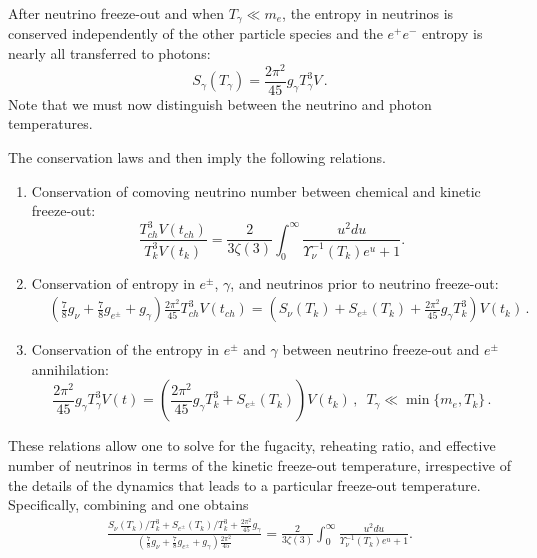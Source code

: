 After neutrino freeze-out and when $T_{\gamma}\ll m_e$, the entropy in neutrinos is conserved independently of the other particle species and the $e^+e^-$ entropy is nearly all transferred to photons:
\begin{equation}
S_{\gamma}(T_\gamma)=\frac{2 \pi^2}{45}g_\gamma T_{\gamma}^3 V\,.
\end{equation}
 Note that we must now distinguish between the neutrino and photon temperatures.

The conservation laws  and  then imply the following relations.
\begin{enumerate}
\item Conservation of comoving neutrino number between chemical and kinetic freeze-out:
\begin{equation}\label{modindeq1}
\frac{T_{ch}^3V(t_{ch})}{T_k^3V(t_k)}=\frac{2}{3\zeta(3)}\int_0^\infty \frac{u^2 du}{\Upsilon_\nu^{-1}(T_k)e^u+1}.
\end{equation}
\item Conservation of entropy in $e^\pm$, $\gamma$, and neutrinos prior to neutrino freeze-out:
\begin{align}\label{modindeq2}
&\left(\frac{7}{8}g_\nu+\frac{7}{8}g_{e^\pm} +g_\gamma \right)\frac{2\pi^2}{45} T_{ch}^3V(t_{ch})=\left(S_{\nu}(T_k)+S_{e^\pm}(T_k)+\frac{2\pi^2}{45}g_\gamma T_k^3\right)V(t_k)\,.
\end{align}
\item Conservation of the entropy in $e^\pm$ and $\gamma$ between neutrino freeze-out and $e^\pm$ annihilation:
\begin{equation}\label{modindeq3}
\frac{2 \pi^2}{45}g_\gamma T_{\gamma}^3 V(t)=\left(\frac{2\pi^2}{45}g_\gamma T_k^3+S_{e^\pm}(T_k)\right)V(t_k)\,, \,\,\, T_\gamma\ll \min\{m_e, T_k\}\,.
\end{equation}
\end{enumerate}

These relations allow one to solve for the fugacity, reheating ratio, and effective number of neutrinos in terms of the kinetic freeze-out temperature, irrespective of the details of the dynamics that leads to a particular freeze-out temperature. Specifically, combining  and  one obtains
\begin{align}
 \frac{S_{\nu}(T_k)/T_k^3+S_{e^\pm}(T_k)/T_k^3+\frac{2\pi^2}{45}g_\gamma }{\left(\frac{7}{8}g_\nu+\frac{7}{8}g_{e^\pm} +g_\gamma \right)\frac{2\pi^2}{45} }=\frac{2}{3\zeta(3)}\int_0^\infty \frac{u^2 du}{\Upsilon_\nu^{-1}(T_k)e^u+1}.
\end{align}

